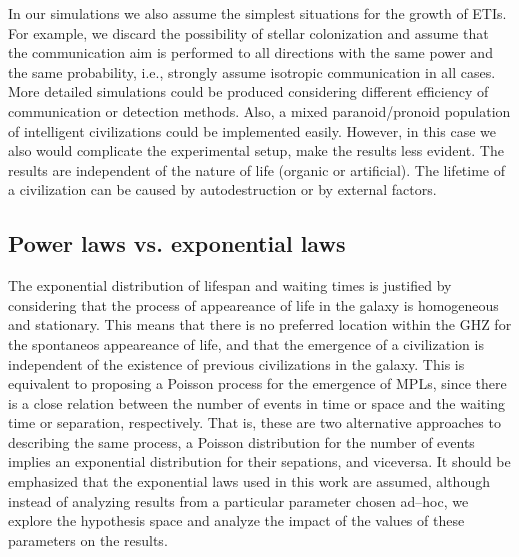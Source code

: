 In our simulations we also assume the simplest situations for the
growth of ETIs.
%
For example, we discard the possibility of stellar colonization
\citep[e.g.][]{newman_galactic_1981, walters_interstellar_1980,
starling_virulence_2013, barlow_galactic_2012, jeong_large_2000,
maccone_mathematical_2011} and assume that the communication aim is
performed to all directions with the same power and the same
probability, i.e., strongly assume isotropic communication in all
cases.
%
More detailed simulations could be produced considering different
efficiency of communication or detection methods.
%
Also, a mixed paranoid/pronoid population of intelligent civilizations
could be implemented easily.
%
However, in this case we also would complicate the experimental setup,
make the results less evident.
%
The results are independent of the nature of life (organic or
artificial).
%
The lifetime of a civilization can be caused by autodestruction or by
external factors.


\subsection{Power laws vs. exponential laws}\label{SS_PDF_shape}

The exponential distribution of lifespan and waiting times is
justified by considering that the process of appeareance of life in
the galaxy is homogeneous and stationary.
%
This means that there is no preferred location within the GHZ for the
spontaneos appeareance of life, and that the emergence of a
civilization is independent of the existence of previous civilizations
in the galaxy.
%            
This is equivalent to proposing a Poisson process for the emergence of
MPLs, since there is a close relation between the number of events in
time or space and the waiting time or separation, respectively.
%
That is, these are two alternative approaches to describing the same
process, a Poisson distribution for the number of events implies an
exponential distribution for their sepations, and viceversa.
%
It should be emphasized that the exponential laws used in this work
are assumed, although instead of analyzing results from a particular
parameter chosen ad--hoc, we explore the hypothesis space and analyze
the impact of the values of these parameters on the results.
                                                           

